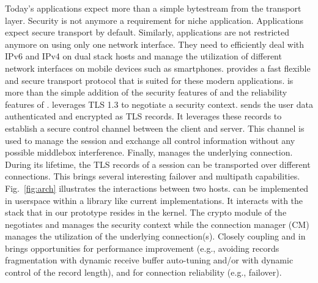  Today's applications expect more than a simple bytestream from the transport layer. Security is not anymore a requirement for niche application. Applications expect secure transport by default. Similarly, applications are not restricted anymore on using only one network interface. They need to efficiently deal with IPv6 and IPv4 on dual stack hosts and manage the utilization of different network interfaces on mobile devices such as smartphones. \tcpls provides a fast
flexible and secure transport protocol that is suited for these modern
applications. \tcpls is more than the simple addition of the security features of \tls and the reliability features of \tcp. \tcpls leverages TLS 1.3 to negotiate a security context. \tcpls sends the user data authenticated and encrypted as TLS records. It leverages these records to establish a secure control channel between the client and server. This channel is used to manage the \tcpls session and exchange all control information without any possible middlebox interference. Finally, \tcpls manages the underlying \tcp connection. During its lifetime,  the TLS records of a \tcpls session can be transported over different \tcp
connections. This brings several interesting failover and multipath capabilities. Fig.~\ref{fig:arch} illustrates the interactions between two \tcpls hosts.
\tcpls can be implemented in userspace within a library like current \tls implementations. It interacts with the \tcp stack that in our prototype resides in the kernel. The crypto module of the \tcpls negotiates and manages the security context while the connection manager (CM) manages the utilization of the underlying \tcp connection(s). Closely coupling \tcp and \tls in \tcpls brings opportunities for performance improvement (e.g., avoiding records fragmentation with dynamic receive buffer auto-tuning and/or with dynamic control of the record length), and for connection reliability (e.g., failover).




